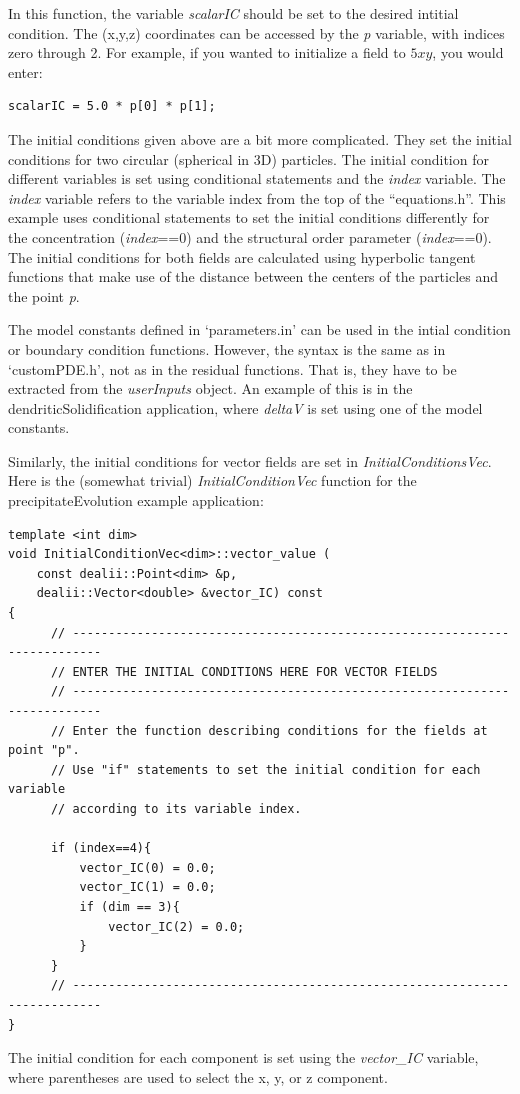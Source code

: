 \documentclass[10pt]{article} %
\begin{document}
In this function, the variable \emph{scalarIC} should be set to the desired intitial condition. The (x,y,z) coordinates can be accessed by the \emph{p} variable, with indices zero through 2. For example, if you wanted to initialize a field to $5xy$, you would enter:
\tiny
\begin{lstlisting} 
scalarIC = 5.0 * p[0] * p[1];
\end{lstlisting} \normalsize
The initial conditions given above are a bit more complicated. They set the initial conditions for two circular (spherical in 3D) particles. The initial condition for different variables is set using conditional statements and the \emph{index} variable. The \emph{index} variable refers to the variable index from the top of the ``equations.h''. This example uses conditional statements to set the initial conditions differently for the concentration (\emph{index}==0) and the structural order parameter  (\emph{index}==0). The initial conditions for both fields are calculated using hyperbolic tangent functions that make use of the distance between the centers of the particles and the point \emph{p}.

The model constants defined in `parameters.in' can be used in the intial condition or boundary condition functions. However, the syntax is the same as in `customPDE.h', not as in the residual functions. That is, they have to be extracted from the \emph{userInputs} object. An example of this is in the dendriticSolidification application, where \emph{deltaV} is set using one of the model constants.

Similarly, the initial conditions for vector fields are set in \emph{InitialConditionsVec}. Here is the (somewhat trivial) \emph{InitialConditionVec} function for the precipitateEvolution example application:
\scriptsize
\begin{lstlisting}
template <int dim>
void InitialConditionVec<dim>::vector_value (
	const dealii::Point<dim> &p,
	dealii::Vector<double> &vector_IC) const
{
	  // --------------------------------------------------------------------------
	  // ENTER THE INITIAL CONDITIONS HERE FOR VECTOR FIELDS
	  // --------------------------------------------------------------------------
	  // Enter the function describing conditions for the fields at point "p".
	  // Use "if" statements to set the initial condition for each variable
	  // according to its variable index.

	  if (index==4){
		  vector_IC(0) = 0.0;
		  vector_IC(1) = 0.0;
          if (dim == 3){
        	  vector_IC(2) = 0.0;
          }
	  }
	  // --------------------------------------------------------------------------
}
\end{lstlisting}
\normalsize
The initial condition for each component is set using the \emph{vector\_IC} variable, where parentheses are used to select the x, y, or z component.
\end{document}
